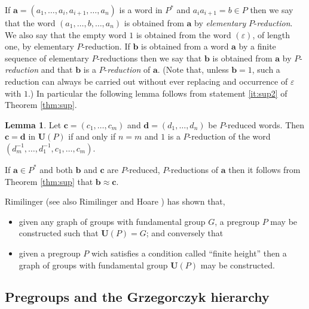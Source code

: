 \documentclass[a4paper]{article}
\newcommand\eps{\varepsilon}
\newcommand{\avec}{\mathbf{a}}	%
\newcommand{\bvec}{\mathbf{b}}	%
\newcommand{\cvec}{\mathbf{c}}	%
\newcommand{\dvec}{\mathbf{d}}	%
\newcommand{\Uvec}{\mathbf{U}}	%
\newcommand{\UP}{\Uvec(P)}
\theoremstyle{plain}
\theoremstyle{definition}
\newtheorem{lemma}[theorem]{Lemma}
\begin{document}
If $\avec=(a_1,\ldots, a_i,a_{i+1},\ldots, a_n)$ is a word in $P^*$ and $a_ia_{i+1}=b\in P$ then
we say that the word  $(a_1,\ldots, b ,\ldots, a_n)$ is obtained from $\avec$ by
\emph{elementary} $P$-\emph{reduction}. We also say that the empty word $1$ is obtained from the 
word $(\eps)$, of length one, by elementary $P$-reduction. If $\bvec$ is obtained from a word $\avec$
 by a finite sequence of elementary $P$-reductions then we say that $\bvec$ is obtained from $\avec$
by $P$-\emph{reduction} and that $\bvec$ is a $P$-\emph{reduction} of $\avec$.  
(Note that, unless $\bvec=1$,  such a reduction can always be carried out without ever
replacing and occurrence of $\eps$ with $1$.) 
In particular the following lemma follows from statement \ref{it:sup2} of Theorem \ref{thm:sup}.
\begin{lemma}\label{lem:interleave}
Let $\cvec=(c_1,\ldots , c_m)$ and $\dvec=(d_1,\ldots, d_n)$ be $P$-reduced words. Then 
$\cvec=\dvec$ in $\UP$  if and only if $n=m$ and $1$ is a $P$-reduction of the word
$(d_m^{-1},\ldots, d_1^{-1},c_1,\ldots , c_m)$. 
\end{lemma}

If $\avec \in P^\ast$ and both $\bvec$ and $\cvec$ are $P$-reduced, $P$-reductions of $\avec$ then
it follows from Theorem \ref{thm:sup} that $\bvec\approx \cvec$. 

Rimilinger \cite{Rimlinger_1987a} (see also Rimilinger \cite{Rimlinger_1987b} and Hoare \cite{Hoare_1988}) 
has shown that, 
\begin{itemize}
\item given any graph of groups with fundamental group $G$, a pregroup $P$ may
be constructed such that $\UP = G$;  and conversely that
\item  given a pregroup $P$ wich satisfies a condition called ``finite height'' then a graph
of groups with fundamental group $\UP$ may be constructed.
\end{itemize}



\subsection{Pregroups and the Grzegorczyk hierarchy}
\end{document}
